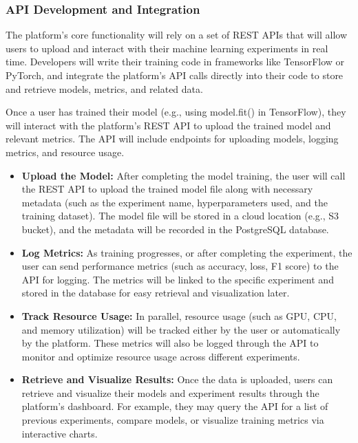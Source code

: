 \documentclass[12pt]{article}
\begin{document}
\subsubsection{API Development and Integration}

The platform’s core functionality will rely on a set of REST APIs that will allow users to upload and interact with their machine learning experiments in real time. Developers will write their training code in frameworks like TensorFlow or PyTorch, and integrate the platform’s API calls directly into their code to store and retrieve models, metrics, and related data.

Once a user has trained their model (e.g., using model.fit() in TensorFlow), they will interact with the platform’s REST API to upload the trained model and relevant metrics. The API will include endpoints for uploading models, logging metrics, and resource usage.


\begin{itemize}

\item \textbf{Upload the Model:}
After completing the model training, the user will call the REST API to upload the trained model file along with necessary metadata (such as the experiment name, hyperparameters used, and the training dataset). The model file will be stored in a cloud location (e.g., S3 bucket), and the metadata will be recorded in the PostgreSQL database.

\item \textbf{Log Metrics:}
As training progresses, or after completing the experiment, the user can send performance metrics (such as accuracy, loss, F1 score) to the API for logging. The metrics will be linked to the specific experiment and stored in the database for easy retrieval and visualization later.

\item \textbf{Track Resource Usage:}
In parallel, resource usage (such as GPU, CPU, and memory utilization) will be tracked either by the user or automatically by the platform. These metrics will also be logged through the API to monitor and optimize resource usage across different experiments.

\item \textbf{Retrieve and Visualize Results:}
Once the data is uploaded, users can retrieve and visualize their models and experiment results through the platform's dashboard. For example, they may query the API for a list of previous experiments, compare models, or visualize training metrics via interactive charts.

\end{itemize}
\end{document}
